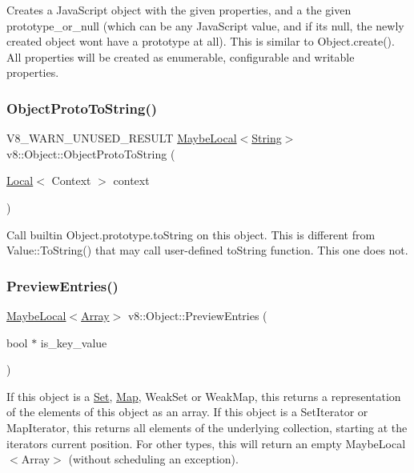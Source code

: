 Creates a Java\+Script object with the given properties, and a the given prototype\+\_\+or\+\_\+null (which can be any Java\+Script value, and if it\textquotesingle{}s null, the newly created object won\textquotesingle{}t have a prototype at all). This is similar to Object.\+create(). All properties will be created as enumerable, configurable and writable properties. \mbox{\label{classv8_1_1Object_a7a65552d78eff4a1b9755f99167f4255}} 
\subsubsection{\texorpdfstring{Object\+Proto\+To\+String()}{ObjectProtoToString()}}
{\footnotesize\ttfamily V8\+\_\+\+W\+A\+R\+N\+\_\+\+U\+N\+U\+S\+E\+D\+\_\+\+R\+E\+S\+U\+LT \mbox{\hyperlink{classv8_1_1MaybeLocal}{Maybe\+Local}}$<$\mbox{\hyperlink{classv8_1_1String}{String}}$>$ v8\+::\+Object\+::\+Object\+Proto\+To\+String (\begin{DoxyParamCaption}\item[{\mbox{\hyperlink{classv8_1_1Local}{Local}}$<$ Context $>$}]{context }\end{DoxyParamCaption})}

Call builtin Object.\+prototype.\+to\+String on this object. This is different from Value\+::\+To\+String() that may call user-\/defined to\+String function. This one does not. \mbox{\label{classv8_1_1Object_a6705d705f6ddb941100a46875609c63a}} 
\subsubsection{\texorpdfstring{Preview\+Entries()}{PreviewEntries()}}
{\footnotesize\ttfamily \mbox{\hyperlink{classv8_1_1MaybeLocal}{Maybe\+Local}}$<$\mbox{\hyperlink{classv8_1_1Array}{Array}}$>$ v8\+::\+Object\+::\+Preview\+Entries (\begin{DoxyParamCaption}\item[{bool $\ast$}]{is\+\_\+key\+\_\+value }\end{DoxyParamCaption})}

If this object is a \mbox{\hyperlink{classv8_1_1Set}{Set}}, \mbox{\hyperlink{classv8_1_1Map}{Map}}, Weak\+Set or Weak\+Map, this returns a representation of the elements of this object as an array. If this object is a Set\+Iterator or Map\+Iterator, this returns all elements of the underlying collection, starting at the iterator\textquotesingle{}s current position. For other types, this will return an empty Maybe\+Local$<$\+Array$>$ (without scheduling an exception). \mbox{\label{classv8_1_1Object_a064c7ba0abe1237086af4201b505f91e}} 
